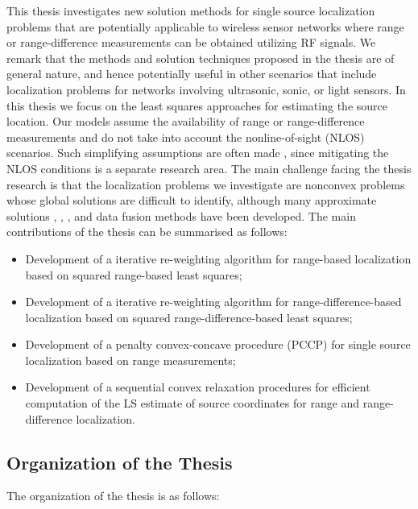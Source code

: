 This thesis investigates new solution methods for single source localization problems that are potentially applicable to wireless sensor networks where range or range-difference measurements can be obtained utilizing RF signals. We remark
that the methods and solution techniques proposed in the thesis are of general nature, and hence potentially useful in other scenarios that include localization problems for networks involving  ultrasonic, sonic, or light sensors. 
In this thesis we focus on the least squares approaches for estimating the source location. Our models assume the availability of range or range-difference measurements and do not take into account the nonline-of-sight (NLOS) scenarios. Such simplifying assumptions are often made \cite{Cheung}, \cite{classMDS} since mitigating the NLOS conditions is a separate research area. The main challenge facing the thesis research is that the localization problems we investigate
are nonconvex problems whose global solutions are difficult to identify, although many
approximate solutions \cite{Cheung}, \cite{LiHu},  \cite{SmithAbel}, and data fusion methods \cite{Sayed} have been developed. The main contributions of the thesis can be summarised as follows:

\begin{itemize}
\item
Development of a iterative re-weighting algorithm for range-based localization based on squared range-based least squares;

\item
Development of a iterative re-weighting algorithm for range-difference-based localization based on squared range-difference-based least squares;

\item
Development of a penalty convex-concave procedure (PCCP) for single source localization based on range measurements;

\item
Development of a sequential convex relaxation procedures for efficient computation of the LS estimate of source coordinates for range and range-difference localization.


\end{itemize}


\subsection{Organization of the Thesis} \label{organization}

The organization of the thesis is  as follows:

